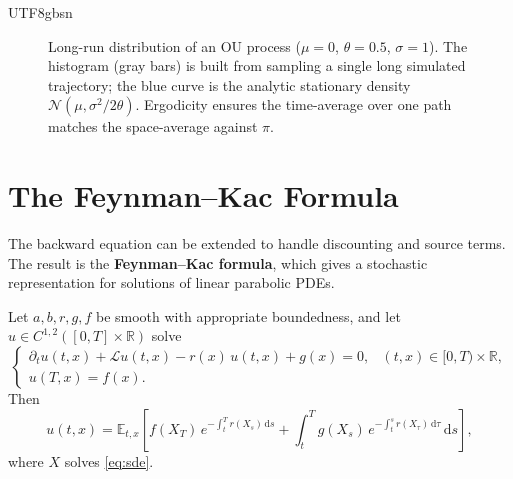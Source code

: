 \documentclass{article}
\begin{document}
\begin{CJK*}{UTF8}{gbsn}
\begin{figure}[h]
\centering
{}
\caption{Long-run distribution of an OU process ($\mu=0$, $\theta=0.5$, $\sigma=1$). The histogram (gray bars) is built from sampling a single long simulated trajectory; the blue curve is the analytic stationary density $\mathcal{N}(\mu,\sigma^2/2\theta)$. Ergodicity ensures the time-average over one path matches the space-average against $\pi$.}
\label{fig:ou-stationary}
\end{figure}

\section{The Feynman--Kac Formula}

The backward equation can be extended to handle discounting and source terms. The result is the \textbf{Feynman--Kac formula}, which gives a stochastic representation for solutions of linear parabolic PDEs.

\begin{theorem}\label{thm:feynmankac}
Let $a,b,r,g,f$ be smooth with appropriate boundedness, and let $u\in C^{1,2}([0,T]\times\mathbb{R})$ solve
\[
  \begin{cases}
    \partial_t u(t,x)+\mathcal{L}u(t,x)-r(x)\,u(t,x)+g(x)=0,&(t,x)\in[0,T)\times\mathbb{R},\\
    u(T,x)=f(x).
  \end{cases}
\]
Then
\[
  u(t,x)=\mathbb{E}_{t,x}\!\left[f(X_T)\,e^{-\int_t^T r(X_s)\,\mathrm{d}s}+\int_t^T g(X_s)\,e^{-\int_t^s r(X_\tau)\,\mathrm{d}\tau}\,\mathrm{d}s\right],
\]
where $X$ solves \eqref{eq:sde}.
\end{theorem}


\end{CJK*}
\end{document}
